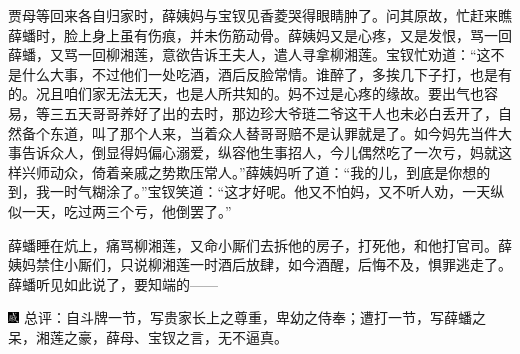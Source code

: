 贾母等回来各自归家时，薛姨妈与宝钗见香菱哭得眼睛肿了。问其原故，忙赶来瞧薛蟠时，脸上身上虽有伤痕，并未伤筋动骨。薛姨妈又是心疼，又是发恨，骂一回薛蟠，又骂一回柳湘莲，意欲告诉王夫人，遣人寻拿柳湘莲。宝钗忙劝道：“这不是什么大事，不过他们一处吃酒，酒后反脸常情。谁醉了，多挨几下子打，也是有的。况且咱们家无法无天，也是人所共知的。妈不过是心疼的缘故。要出气也容易，等三五天哥哥养好了出的去时，那边珍大爷琏二爷这干人也未必白丢开了，自然备个东道，叫了那个人来，当着众人替哥哥赔不是认罪就是了。如今妈先当件大事告诉众人，倒显得妈偏心溺爱，纵容他生事招人，今儿偶然吃了一次亏，妈就这样兴师动众，倚着亲戚之势欺压常人。”薛姨妈听了道：“我的儿，到底是你想的到，我一时气糊涂了。”宝钗笑道：“这才好呢。他又不怕妈，又不听人劝，一天纵似一天，吃过两三个亏，他倒罢了。”

薛蟠睡在炕上，痛骂柳湘莲，又命小厮们去拆他的房子，打死他，和他打官司。薛姨妈禁住小厮们，只说柳湘莲一时酒后放肆，如今酒醒，后悔不及，惧罪逃走了。薛蟠听见如此说了，要知端的------

{\includegraphics[width=3mm]{../Images/00005}  \kaishu 总评：自斗牌一节，写贵家长上之尊重，卑幼之侍奉；遭打一节，写薛蟠之呆，湘莲之豪，薛母、宝钗之言，无不逼真。}
